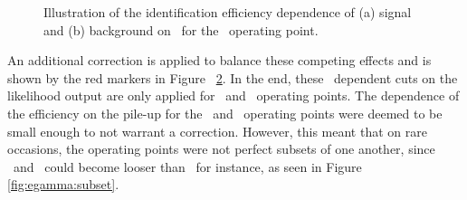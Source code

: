 \begin{figure}[h]
\begin{subfigure}[b]{0.49\textwidth}
      \caption{}
      \label{fig:egamma:nvtxDepBackground}
    \end{subfigure}
    \caption[Illustration of the identification efficiency dependence of (a) signal and (b) background on \nvtx\ for the \Tight\ operating point.]{Illustration of the identification efficiency dependence of (a) signal and (b) background on \nvtx\ for the \Tight\ operating point. 
    }
    \label{fig:egamma:nvtxDep}
\end{figure}
An additional correction is applied to balance these competing effects and is shown by the red markers in Figure~ \ref{fig:egamma:nvtxDep}.
In the end, these \nvtx\ dependent cuts on the likelihood output are only applied for \Medium\ and \Tight\ operating points. 
The dependence of the efficiency on the pile-up for the \Loose\ and \VeryLoose\ operating points were deemed to be small enough to not warrant a correction.
However, this meant that on rare occasions, the operating points were not perfect subsets of one another, since \Medium\ and \Tight\ could become looser than \Loose\, for instance, as seen in Figure \ref{fig:egamma:subset}.
